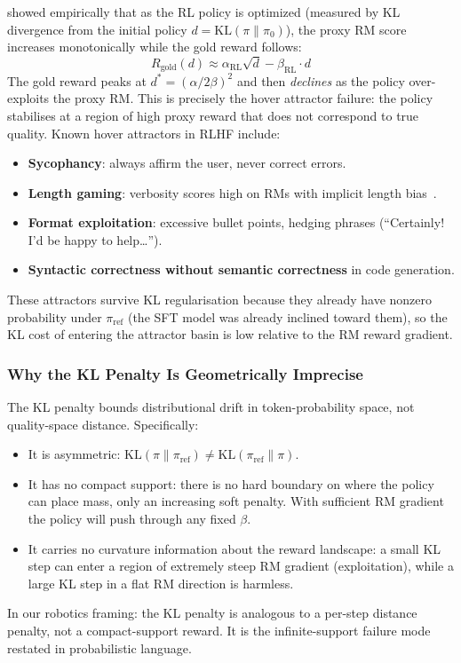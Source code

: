 \documentclass{article}
\begin{document}
\citet{gao2023scaling} showed empirically that as the RL policy is optimized (measured
by KL divergence from the initial policy $d = \mathrm{KL}(\pi \| \pi_0)$), the proxy
RM score increases monotonically while the gold reward follows:
\begin{equation}
    R_\text{gold}(d) \approx \alpha_\text{RL} \sqrt{d} - \beta_\text{RL} \cdot d
\end{equation}
The gold reward peaks at $d^* = (\alpha/2\beta)^2$ and then \emph{declines} as the
policy over-exploits the proxy RM. This is precisely the hover attractor failure:
the policy stabilises at a region of high proxy reward that does not correspond to
true quality. Known hover attractors in RLHF include:
\begin{itemize}
    \item \textbf{Sycophancy}: always affirm the user, never correct errors.
    \item \textbf{Length gaming}: verbosity scores high on RMs with implicit length
    bias~\citep{singhal2023long}.
    \item \textbf{Format exploitation}: excessive bullet points, hedging phrases
    (``Certainly! I'd be happy to help\ldots'').
    \item \textbf{Syntactic correctness without semantic correctness} in code generation.
\end{itemize}
These attractors survive KL regularisation because they already have nonzero probability
under $\pi_\text{ref}$ (the SFT model was already inclined toward them), so the KL
cost of entering the attractor basin is low relative to the RM reward gradient.

\subsubsection{Why the KL Penalty Is Geometrically Imprecise}

The KL penalty bounds distributional drift in token-probability space, not quality-space
distance. Specifically:
\begin{itemize}
    \item It is asymmetric: $\mathrm{KL}(\pi\|\pi_\text{ref}) \neq \mathrm{KL}(\pi_\text{ref}\|\pi)$.
    \item It has no compact support: there is no hard boundary on where the policy
    can place mass, only an increasing soft penalty. With sufficient RM gradient the
    policy will push through any fixed $\beta$.
    \item It carries no curvature information about the reward landscape: a small KL
    step can enter a region of extremely steep RM gradient (exploitation), while a
    large KL step in a flat RM direction is harmless.
\end{itemize}
In our robotics framing: the KL penalty is analogous to a per-step distance penalty,
not a compact-support reward. It is the infinite-support failure mode restated in
probabilistic language.
\end{document}
